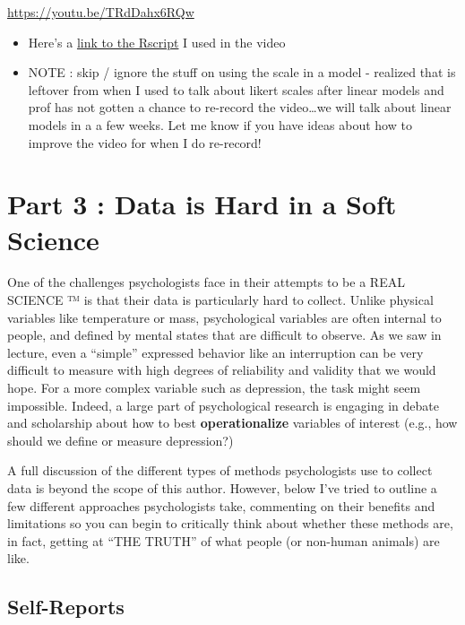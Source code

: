 \documentclass[
  letterpaper,
  DIV=11,
  numbers=noendperiod,
  oneside]{scrreprt}
\providecommand{\tightlist}{%
  \setlength{\itemsep}{0pt}\setlength{\parskip}{0pt}}\usepackage{longtable,booktabs,array}
\begin{document}
\url{https://youtu.be/TRdDahx6RQw}

\begin{itemize}
\tightlist
\item
  Here's a
  \href{https://www.dropbox.com/s/zsx0shzd3shmpza/likert_scales_c_video.r?dl=0}{link
  to the Rscript} I used in the video
\item
  NOTE : skip / ignore the stuff on using the scale in a model -
  realized that is leftover from when I used to talk about likert scales
  after linear models and prof has not gotten a chance to re-record the
  video\ldots we will talk about linear models in a a few weeks. Let me
  know if you have ideas about how to improve the video for when I do
  re-record!
\end{itemize}

\chapter{Part 3 : Data is Hard in a Soft
Science}\label{part-3-data-is-hard-in-a-soft-science}

One of the challenges psychologists face in their attempts to be a REAL
SCIENCE ™ is that their data is particularly hard to collect. Unlike
physical variables like temperature or mass, psychological variables are
often internal to people, and defined by mental states that are
difficult to observe. As we saw in lecture, even a ``simple'' expressed
behavior like an interruption can be very difficult to measure with high
degrees of reliability and validity that we would hope. For a more
complex variable such as depression, the task might seem impossible.
Indeed, a large part of psychological research is engaging in debate and
scholarship about how to best \textbf{operationalize} variables of
interest (e.g., how should we define or measure depression?)~

A full discussion of the different types of methods psychologists use to
collect data is beyond the scope of this author. However, below I've
tried to outline a few different approaches psychologists take,
commenting on their benefits and limitations so you can begin to
critically think about whether these methods are, in fact, getting at
``THE TRUTH'' of what people (or non-human animals) are like.

\section{Self-Reports}\label{self-reports}
\end{document}
